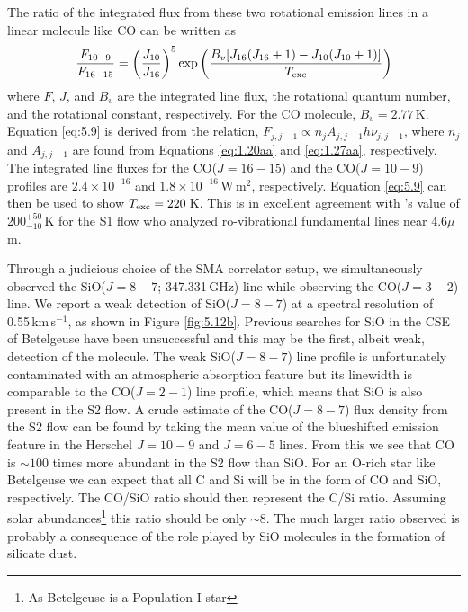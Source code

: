 The ratio of the integrated flux from these two rotational emission lines in a linear molecule like CO can be written as 
\begin{equation}
\frac{F_{10-9}}{F_{16-15}}=\left(\frac{J_{10}}{J_{16}} \right)^5 \mathrm{exp}\left(\frac{B_{v}[J_{16}(J_{16}+1)-J_{10}(J_{10} +1)]}{T_{\rm{exc}}} \right)
\label{eq:5.9}
\end{equation}
where $F$, $J$, and $B_{v}$ are the integrated line flux, the rotational quantum number, and the rotational constant, respectively. For the CO molecule, $B_{v}= 2.77$\,K. Equation \ref{eq:5.9} is derived from the relation, $F_{j,j-1} \propto n_{j}A_{j,j-1}h\nu _{j,j-1}$, where $n_{j}$ and $A_{j,j-1}$ are found from Equations \ref{eq:1.20aa} and \ref{eq:1.27aa}, respectively. The integrated line fluxes for the CO($J=16-15$) and the CO($J=10-9$) profiles are $2.4\times 10^{-16}$  and $1.8\times 10^{-16}$\,W\,m$^2$, respectively. Equation \ref{eq:5.9} can then be used to show $T_{\rm{exc}} = 220$\,K. This is in excellent agreement with \citeauthor{bernat_1979}'s \citeyear{bernat_1979} value of 200$^{+50}_{-10}$\,K for the S1 flow who analyzed ro-vibrational fundamental lines near $4.6\mu$m.

Through a judicious choice of the SMA correlator setup, we simultaneously observed the SiO($J=8-7$; 347.331\,GHz) line while observing the CO($J=3-2$) line. We report a weak detection of SiO($J = 8-7$)  at a spectral resolution of 0.55\,km\,s$^{-1}$, as shown in Figure \ref{fig:5.12b}. Previous searches for SiO in the CSE of Betelgeuse have been unsuccessful \cite[e.g.,][]{lambert_1978} and this may be the first, albeit weak, detection of the molecule. The weak SiO($J=8-7$) line profile is unfortunately contaminated with an atmospheric absorption feature but its linewidth is comparable to the CO($J=2-1$) line profile, which means that SiO is also present in the S2 flow. A crude estimate of the CO($J=8-7$) flux density from the S2 flow can be found by taking the mean value of the blueshifted emission feature in the Herschel $J=10-9$ and $J=6-5$ lines. From this we see that CO is $\sim 100$ times more abundant in the S2 flow than SiO. For an O-rich star like Betelgeuse we can expect that all C and Si will be in the form of CO and SiO, respectively. The CO/SiO ratio should then represent the C/Si ratio. Assuming solar abundances\footnote{As Betelgeuse is a Population I star} this ratio should be only $\sim 8$. The much larger ratio observed is probably a consequence of the role played by SiO molecules in the formation of silicate dust.

